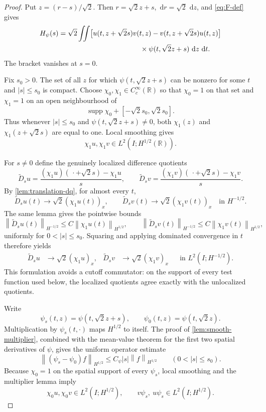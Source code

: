 \documentclass[11pt,oneside]{book}
\theoremstyle{definition}
\theoremstyle{remark}
\newcommand{\R}{\mathbb R}
\newcommand{\supp}{\operatorname{supp}}
\newcommand{\1}{\mathbf 1}
\newcommand{\dd}{\,\mathrm d}
\newcommand{\norm}[1]{\left\lVert #1\right\rVert}
\begin{document}
\begin{proof}
Put $z=(r-s)/\sqrt2$.  Then $r=\sqrt2z+s$, $\dd r=\sqrt2\,\dd z$, and
\eqref{eq:F-def} gives
\begin{align}
 H_\psi(s)=\sqrt2\iint
 &\big[u(t,z+\sqrt2s)v(t,z)-v(t,z+\sqrt2s)u(t,z)\big]\notag\\
 &\hspace{25mm}\times\psi(t,\sqrt2z+s)\,\dd z\,\dd t. \label{eq:Hpsi-expanded}
\end{align}
The bracket vanishes at $s=0$.

Fix $s_0>0$.  The set of all $z$ for which
$\psi(t,\sqrt2z+s)$ can be nonzero for some $t$ and $|s|\le s_0$ is compact.
Choose $\chi_0,\chi_1\in C_c^\infty(\R)$ so that $\chi_0=1$ on that set and
$\chi_1=1$ on an open neighbourhood of
\[
 \supp\chi_0+[-\sqrt2s_0,\sqrt2s_0].
\]
Thus whenever $|s|\le s_0$ and $\psi(t,\sqrt2z+s)\ne0$, both
$\chi_1(z)$ and $\chi_1(z+\sqrt2s)$ are equal to one.  Local smoothing gives
\[
 \chi_1u,\chi_1v\in L^2(I;H^{1/2}(\R)).
\]

For $s\ne0$ define the genuinely localized difference quotients
\[
 \widetilde D_su
   =\frac{(\chi_1u)(\,\cdot+\sqrt2s)-\chi_1u}{s},
 \qquad
 \widetilde D_sv
   =\frac{(\chi_1v)(\,\cdot+\sqrt2s)-\chi_1v}{s}.
\]
By \cref{lem:translation-dq}, for almost every $t$,
\[
 \widetilde D_su(t)\longrightarrow\sqrt2(\chi_1u(t))_x,
 \qquad
 \widetilde D_sv(t)\longrightarrow\sqrt2(\chi_1v(t))_x
 \quad\text{in }H^{-1/2}.
\]
The same lemma gives the pointwise bounds
\[
 \norm{\widetilde D_su(t)}_{H^{-1/2}}
 \le C\norm{\chi_1u(t)}_{H^{1/2}},
 \qquad
 \norm{\widetilde D_sv(t)}_{H^{-1/2}}
 \le C\norm{\chi_1v(t)}_{H^{1/2}},
\]
uniformly for $0<|s|\le s_0$.  Squaring and applying dominated convergence
in $t$ therefore yields
\begin{align}
 \widetilde D_su&\longrightarrow\sqrt2(\chi_1u)_x,
 &\widetilde D_sv&\longrightarrow\sqrt2(\chi_1v)_x
 &&\text{in }L^2(I;H^{-1/2}).                 \label{eq:DQ-time-convergence}
\end{align}
This formulation avoids a cutoff commutator: on the support of every test
function used below, the localized quotients agree exactly with the
unlocalized quotients.

Write
\[
 \psi_s(t,z)=\psi(t,\sqrt2z+s),
 \qquad \psi_0(t,z)=\psi(t,\sqrt2z).
\]
Multiplication by $\psi_s(t,\cdot)$ maps $H^{1/2}$ to itself.  The proof of
\cref{lem:smooth-multiplier}, combined with the mean-value theorem for the
first two spatial derivatives of $\psi$, gives the uniform operator estimate
\begin{equation}
 \norm{(\psi_s-\psi_0)f}_{H^{1/2}}
 \le C_\psi|s|\norm f_{H^{1/2}}
 \qquad(0<|s|\le s_0).                         \label{eq:translated-test-multiplier}
\end{equation}
Because $\chi_0=1$ on the spatial support of every $\psi_s$,
local smoothing and the multiplier lemma imply
\[
 \chi_0u,\chi_0v\in L^2(I;H^{1/2}),
 \qquad
 v\psi_s,\ u\psi_s\in L^2(I;H^{1/2}).
\]


\end{proof}
\end{document}
